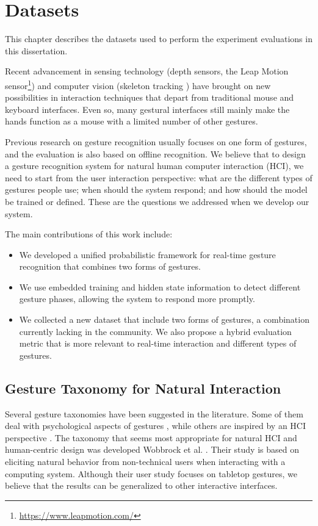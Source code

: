 \chapter{Datasets}
This chapter describes the datasets used to perform the experiment evaluations
in this dissertation.

Recent advancement in sensing technology (depth sensors, the Leap Motion
sensor\footnote{\url{https://www.leapmotion.com/}}) and computer vision
(skeleton tracking \cite{shotton13}) have brought on new possibilities in interaction techniques that depart from traditional mouse
and keyboard interfaces. Even so, many gestural
interfaces still mainly make the hands function as a mouse
with a limited number of other gestures. 

Previous research on gesture
recognition usually focuses on one form of gestures, and the evaluation is also
based on offline recognition. We believe that to design a gesture
recognition system for natural human computer interaction (HCI), we need to
start from the user interaction perspective:
what are the different types of gestures people use;
when should the system respond; and how should the model be trained or defined.
These are the questions we addressed when we develop our system.

The main contributions of this work include:
\begin{itemize}
  \item We developed a unified probabilistic framework for real-time gesture
  recognition that combines two forms of gestures.
  \item We use embedded training and hidden state information to detect
  different gesture phases, allowing the system to respond more promptly.
  \item We collected a new dataset that include two forms of gestures, a
  combination currently lacking in the community. We also propose a hybrid
  evaluation metric that is more relevant to real-time interaction and different
  types of gestures.
\end{itemize}

\section{Gesture Taxonomy for Natural Interaction}\label{sec:taxonomy}
Several gesture taxonomies have been suggested in the literature. Some of them
deal with psychological aspects of gestures \cite{kendon86, mcneill82}, while
others are inspired by an HCI perspective \cite{quek94,
quek95, Pavlovic97}. The taxonomy that seems most appropriate for natural HCI
and human-centric design was developed Wobbrock et al. \cite{wobbrock09}. Their
study is based on eliciting natural behavior from non-technical users when
interacting with a computing system. Although their user study focuses on
tabletop gestures, we believe that the results can be generalized to other
interactive interfaces. 

